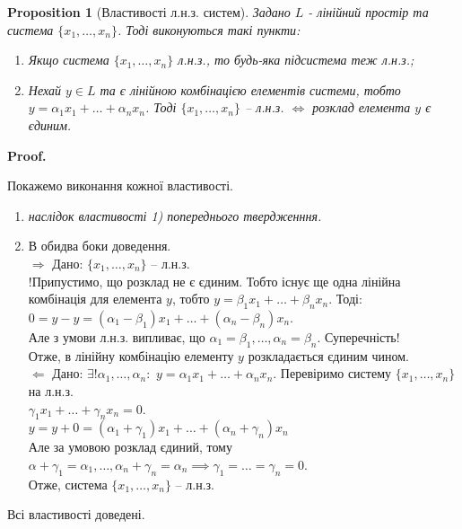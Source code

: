 \documentclass[a4paper, 10pt]{article}
\makeatletter
\def\rightproof{$\boxed{\Rightarrow}$ }
\def\leftproof{$\boxed{\Leftarrow}$ }
\theoremstyle{theoremdd}
\newtheorem{proposition}[theorem]{Proposition}
\renewenvironment{proof}[1][Proof.\\]{\par
\pushQED{\hfill \qed}%
\normalfont \topsep6\p@\@plus6\p@\relax
\trivlist
\item\relax
{\bfseries
#1\@addpunct{.}}\hspace\labelsep\ignorespaces
}{%
\popQED\endtrivlist\@endpefalse
}
\makeatother
\begin{document}
	\begin{proposition}[Властивості л.н.з. систем]
	Задано $L$ - лінійний простір та система $\{x_1,\dots,x_n\}$. Тоді виконуються такі пункти:
	\begin{enumerate}[nosep, wide = 0pt, label={\arabic*)}]
	\item Якщо система $\{x_1, \dots, x_n\}$ л.н.з., то будь-яка підсистема теж л.н.з.;
	\item Нехай $y \in L$ та є лінійною комбінацією елементів системи, тобто $y = \alpha_1 x_1 + \dots + \alpha_n x_n$. Тоді $\{x_1, \dots, x_n\}$ -- л.н.з. $\iff$ розклад елемента $y$ є єдиним.
	\end{enumerate}
	\end{proposition}
	
	\begin{proof}
	Покажемо виконання кожної властивості.
	\begin{enumerate}[topsep=-\parskip, wide=0pt, label={\arabic*)}]
	\item \textit{наслідок властивості 1) попереднього твердженння.}
	\item В обидва боки доведення.\\
	\rightproof Дано: $\{x_1, \dots, x_n \}$ -- л.н.з.\\
	!Припустимо, що розклад не є єдиним. Тобто існує ще одна лінійна комбінація для елемента $y$, тобто $y = \beta_1 x_1 + \dots + \beta_n x_n$. Тоді:\\
	$0 = y - y = (\alpha_1 - \beta_1)x_1 + \dots + (\alpha_n - \beta_n)x_n$.\\
	Але з умови л.н.з. випливає, що $\alpha_1 = \beta_1, \dots, \alpha_n = \beta_n$. Суперечність! \\ 
	Отже, в лінійну комбінацію елементу $y$ розкладається єдиним чином.
	\bigskip \\
	\leftproof Дано: $\exists! \alpha_1, \dots, \alpha_n:$
	$y = \alpha_1 x_1 + \dots + \alpha_n x_n$. Перевіримо систему $\{x_1, \dots, x_n\}$ на л.н.з.\\
	$\gamma_1 x_1 + \dots + \gamma_n x_n = 0$.\\
	$y = y + 0 = (\alpha_1 + \gamma_1)x_1 + \dots + (\alpha_n + \gamma_n)x_n$\\
	Але за умовою розклад єдиний, тому $\alpha + \gamma_1 = \alpha_1, \dots, \alpha_n + \gamma_n = \alpha_n \implies \gamma_1 = \dots = \gamma_n = 0$.\\
	Отже, система $\{x_1,\dots,x_n\}$ -- л.н.з.
	\end{enumerate}
	Всі властивості доведені.
	\end{proof}
	
\end{document}

